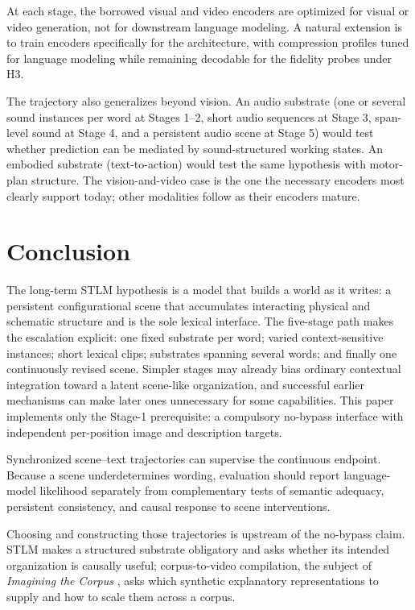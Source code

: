 \documentclass[11pt,a4paper]{article}
\begin{document}
At each stage, the borrowed visual and video encoders are optimized for visual or video generation, not for downstream language modeling. A natural extension is to train encoders specifically for the architecture, with compression profiles tuned for language modeling while remaining decodable for the fidelity probes under H3.

The trajectory also generalizes beyond vision. An audio substrate (one or several sound instances per word at Stages 1--2, short audio sequences at Stage 3, span-level sound at Stage 4, and a persistent audio scene at Stage 5) would test whether prediction can be mediated by sound-structured working states. An embodied substrate (text-to-action) would test the same hypothesis with motor-plan structure. The vision-and-video case is the one the necessary encoders most clearly support today; other modalities follow as their encoders mature.

\section{Conclusion}

The long-term STLM hypothesis is a model that builds a world as it writes: a persistent configurational scene that accumulates interacting physical and schematic structure and is the sole lexical interface. The five-stage path makes the escalation explicit: one fixed substrate per word; varied context-sensitive instances; short lexical clips; substrates spanning several words; and finally one continuously revised scene. Simpler stages may already bias ordinary contextual integration toward a latent scene-like organization, and successful earlier mechanisms can make later ones unnecessary for some capabilities. This paper implements only the Stage-1 prerequisite: a compulsory no-bypass interface with independent per-position image and description targets.

Synchronized scene--text trajectories can supervise the continuous endpoint. Because a scene underdetermines wording, evaluation should report language-model likelihood separately from complementary tests of semantic adequacy, persistent consistency, and causal response to scene interventions.

Choosing and constructing those trajectories is upstream of the no-bypass claim. STLM makes a structured substrate obligatory and asks whether its intended organization is causally useful; corpus-to-video compilation, the subject of \emph{Imagining the Corpus} \cite{documentworld2026}, asks which synthetic explanatory representations to supply and how to scale them across a corpus.
\end{document}
